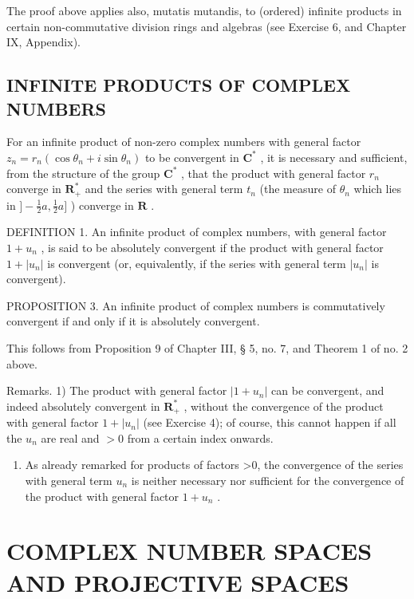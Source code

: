 The proof above applies also, mutatis mutandis, to (ordered) infinite products in certain non-commutative division rings and algebras (see Exercise 6, and Chapter IX, Appendix).

\subsection{INFINITE PRODUCTS OF COMPLEX NUMBERS}

For an infinite product of non-zero complex numbers with general factor \(z_{n} = r_{n}(\cos \theta_{n} + i\sin \theta_{n})\) to be convergent in \(\mathbf{C}^{*}\) , it is necessary and sufficient, from the structure of the group \(\mathbf{C}^{*}\) , that the product with general factor \(r_{n}\) converge in \(\mathbf{R}_{+}^{*}\) and the series with general term \(t_{n}\) (the measure of \(\theta_{n}\) which lies in \(] - \frac{1}{2} a, \frac{1}{2} a]\) ) converge in \(\mathbf{R}\) .

DEFINITION 1. An infinite product of complex numbers, with general factor \(1 + u_{n}\) , is said to be absolutely convergent if the product with general factor \(1 + |u_{n}|\) is convergent (or, equivalently, if the series with general term \(|u_{n}|\) is convergent).

PROPOSITION 3. An infinite product of complex numbers is commutatively convergent if and only if it is absolutely convergent.

This follows from Proposition 9 of Chapter III, § 5, no. 7, and Theorem 1 of no. 2 above.

Remarks. 1) The product with general factor \(|1 + u_n|\) can be convergent, and indeed absolutely convergent in \(\mathbf{R}_+^*\) , without the convergence of the product with general factor \(1 + |u_n|\) (see Exercise 4); of course, this cannot happen if all the \(u_n\) are real and \(>0\) from a certain index onwards.

\begin{enumerate}
\def\labelenumi{\arabic{enumi})}
\setcounter{enumi}{1}
\tightlist
\item
  As already remarked for products of factors \textgreater0, the convergence of the series with general term \(u_{n}\) is neither necessary nor sufficient for the convergence of the product with general factor \(1 + u_{n}\) .
\end{enumerate}

\section{COMPLEX NUMBER SPACES AND PROJECTIVE SPACES}

